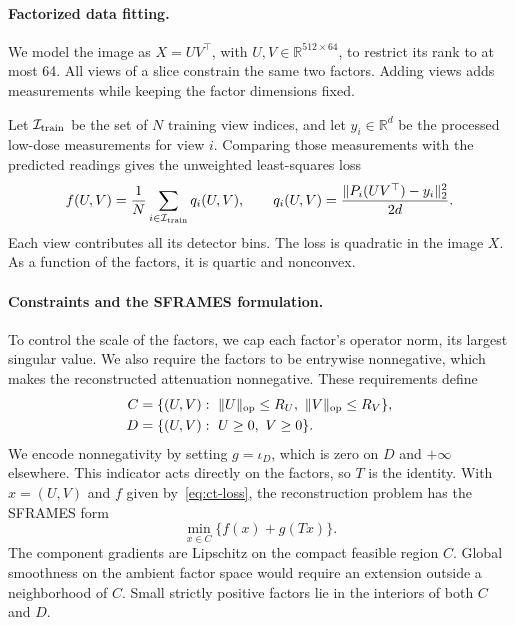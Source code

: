 \documentclass[11pt]{article}
\begin{document}
\paragraph{Factorized data fitting.}
We model the image as \(X=UV^\top\), with \(U,V\in\mathbb R^{512\times64}\), to restrict its rank to at most 64. All views of a slice constrain the same two factors. Adding views adds measurements while keeping the factor dimensions fixed.

Let \(\mathcal I_{\rm train}\) be the set of \(N\) training view indices, and let \(y_i\in\mathbb R^d\) be the processed low-dose measurements for view \(i\). Comparing those measurements with the predicted readings gives the unweighted least-squares loss
\begin{equation}
  f(U,V)=\frac{1}{N}\sum_{i\in\mathcal I_{\rm train}} q_i(U,V),
  \qquad
  q_i(U,V)=\frac{\|P_i(UV^\top)-y_i\|_2^2}{2d}.
  \label{eq:ct-loss}
\end{equation}
Each view contributes all its detector bins. The loss is quadratic in the image \(X\). As a function of the factors, it is quartic and nonconvex.

\paragraph{Constraints and the SFRAMES formulation.}
To control the scale of the factors, we cap each factor's operator norm, its largest singular value. We also require the factors to be entrywise nonnegative, which makes the reconstructed attenuation nonnegative. These requirements define
\begin{align}
  C&=\{(U,V):\ \|U\|_{\rm op}\le R_U,\ \|V\|_{\rm op}\le R_V\}, \\
  D&=\{(U,V):\ U\ge 0,\ V\ge 0\}.
\end{align}
We encode nonnegativity by setting \(g=\iota_D\), which is zero on \(D\) and \(+\infty\) elsewhere. This indicator acts directly on the factors, so \(T\) is the identity. With \(x=(U,V)\) and \(f\) given by~\eqref{eq:ct-loss}, the reconstruction problem has the SFRAMES form
\begin{equation}
  \min_{x\in C}\bigl\{f(x)+g(Tx)\bigr\}.
\end{equation}
The component gradients are Lipschitz on the compact feasible region \(C\). Global smoothness on the ambient factor space would require an extension outside a neighborhood of \(C\). Small strictly positive factors lie in the interiors of both \(C\) and \(D\).
\end{document}
